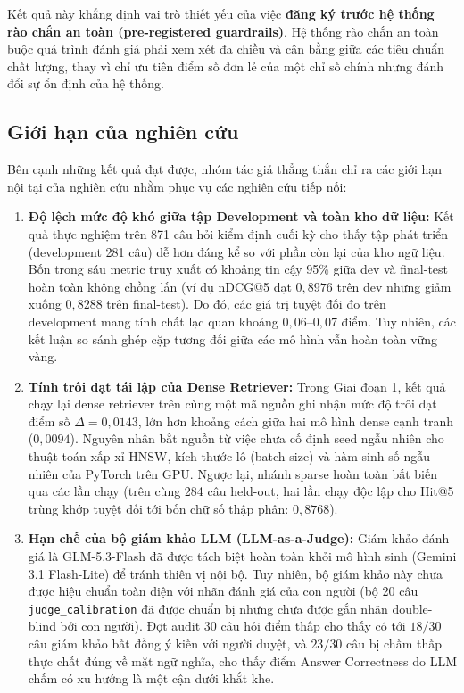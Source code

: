 Kết quả này khẳng định vai trò thiết yếu của việc \textbf{đăng ký trước hệ thống rào chắn an toàn (pre-registered guardrails)}. Hệ thống rào chắn an toàn buộc quá trình đánh giá phải xem xét đa chiều và cân bằng giữa các tiêu chuẩn chất lượng, thay vì chỉ ưu tiên điểm số đơn lẻ của một chỉ số chính nhưng đánh đổi sự ổn định của hệ thống.

\subsection{Giới hạn của nghiên cứu}

Bên cạnh những kết quả đạt được, nhóm tác giả thẳng thắn chỉ ra các giới hạn nội tại của nghiên cứu nhằm phục vụ các nghiên cứu tiếp nối:

\begin{enumerate}
  \item \textbf{Độ lệch mức độ khó giữa tập Development và toàn kho dữ liệu:}
  Kết quả thực nghiệm trên 871 câu hỏi kiểm định cuối kỳ cho thấy tập phát triển (development 281 câu) dễ hơn đáng kể so với phần còn lại của kho ngữ liệu. Bốn trong sáu metric truy xuất có khoảng tin cậy 95\% giữa dev và final-test hoàn toàn không chồng lấn (ví dụ nDCG@5 đạt $0{,}8976$ trên dev nhưng giảm xuống $0{,}8288$ trên final-test). Do đó, các giá trị tuyệt đối đo trên development mang tính chất lạc quan khoảng $0{,}06\text{--}0{,}07$ điểm. Tuy nhiên, các kết luận so sánh ghép cặp tương đối giữa các mô hình vẫn hoàn toàn vững vàng.

  \item \textbf{Tính trôi dạt tái lập của Dense Retriever:}
  Trong Giai đoạn 1, kết quả chạy lại dense retriever trên cùng một mã nguồn ghi nhận mức độ trôi dạt điểm số $\Delta = 0{,}0143$, lớn hơn khoảng cách giữa hai mô hình dense cạnh tranh ($0{,}0094$). Nguyên nhân bắt nguồn từ việc chưa cố định seed ngẫu nhiên cho thuật toán xấp xỉ HNSW, kích thước lô (batch size) và hàm sinh số ngẫu nhiên của PyTorch trên GPU. Ngược lại, nhánh sparse hoàn toàn bất biến qua các lần chạy (trên cùng 284 câu held-out, hai lần chạy độc lập cho Hit@5 trùng khớp tuyệt đối tới bốn chữ số thập phân: $0{,}8768$).

  \item \textbf{Hạn chế của bộ giám khảo LLM (LLM-as-a-Judge):}
  Giám khảo đánh giá là GLM-5.3-Flash đã được tách biệt hoàn toàn khỏi mô hình sinh (Gemini 3.1 Flash-Lite) để tránh thiên vị nội bộ. Tuy nhiên, bộ giám khảo này chưa được hiệu chuẩn toàn diện với nhãn đánh giá của con người (bộ 20 câu \texttt{judge\_calibration} đã được chuẩn bị nhưng chưa được gắn nhãn double-blind bởi con người). Đợt audit 30 câu hỏi điểm thấp cho thấy có tới $18/30$ câu giám khảo bất đồng ý kiến với người duyệt, và $23/30$ câu bị chấm thấp thực chất đúng về mặt ngữ nghĩa, cho thấy điểm Answer Correctness do LLM chấm có xu hướng là một cận dưới khắt khe.


\end{enumerate}
